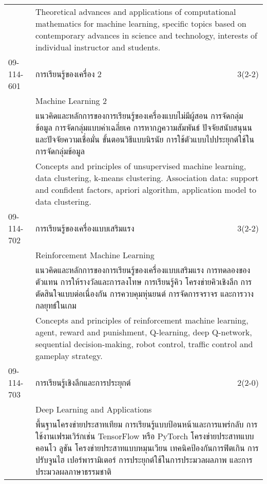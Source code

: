 \begin{longtable}{p{}p{}r{}}
&  \multicolumn{2}{p{0.75\textwidth}}{Theoretical advances and applications of computational mathematics for machine learning, specific topics based on contemporary advances in science and technology, interests of individual instructor and students.} \vspace{8mm} \\*
09-114-601 & การเรียนรู้ของเครื่อง 2 & 3(2-2)\\*
 & Machine Learning 2 & \phantom{x} \vspace{3mm} \\*
&  \multicolumn{2}{p{0.75\textwidth}}{แนวคิดและหลักการของการเรียนรู้ของเครื่องแบบไม่มีผู้สอน การจัดกลุ่มข้อมูล การจัดกลุ่มแบบค่าเฉลี่ยเค การหากฎความสัมพันธ์ ปัจจัยสนับสนุนนและปัจจัยความเชื่อมั่น ขั้นตอนวิธีแบบนิรนัย การใช้ตัวแบบไปประยุกต์ใช้ในการจัดกลุ่มข้อมูล} \vspace{3mm} \\*
&  \multicolumn{2}{p{0.75\textwidth}}{Concepts and principles of unsupervised machine learning, data clustering, k-means clustering. Association data: support and confident factors, apriori algorithm, application model to data clustering.} \vspace{8mm} \\*
09-114-702 & การเรียนรู้ของเครื่องแบบเสริมแรง & 3(2-2)\\*
 & Reinforcement Machine Learning & \phantom{x} \vspace{3mm} \\*
&  \multicolumn{2}{p{0.75\textwidth}}{แนวคิดและหลักการของการเรียนรู้ของเครื่องแบบเสริมแรง การทดลองของตัวแทน การให้รางวัลและการลงโทษ การเรียนรู้คิว โครงข่ายคิวเชิงลึก การตัดสินใจแบบต่อเนื่องกัน การควบคุมหุ่นยนต์ การจัดการจราจร และการวางกลยุทธ์ในเกม} \vspace{3mm} \\*
&  \multicolumn{2}{p{0.75\textwidth}}{Concepts and principles of reinforcement machine learning, agent, reward and punishment, Q-learning, deep Q-network, sequential decision-making, robot control, traffic control and gameplay strategy.} \vspace{8mm} \\*
09-114-703 & การเรียนรู้เชิงลึกและการประยุกต์   & 2(2-0)\\*
 & Deep Learning and Applications & \phantom{x} \vspace{3mm} \\*
&  \multicolumn{2}{p{0.75\textwidth}}{พื้นฐานโครงข่ายประสาทเทียม การเรียนรู้แบบป้อนหน้าและการแพร่กลับ การใช้งานเฟรมเวิร์กเช่น TensorFlow หรือ PyTorch โครงข่ายประสาทแบบคอนโว ลูชัน โครงข่ายประสาทแบบหมุนเวียน เทคนิคป้องกันการฟิตเกิน การปรับจูนไฮ เปอร์พารามิเตอร์ การประยุกต์ใช้ในการประมวลผลภาพ และการประมวลผลภาษาธรรมชาติ} \vspace{3mm} \\*

\end{longtable}
